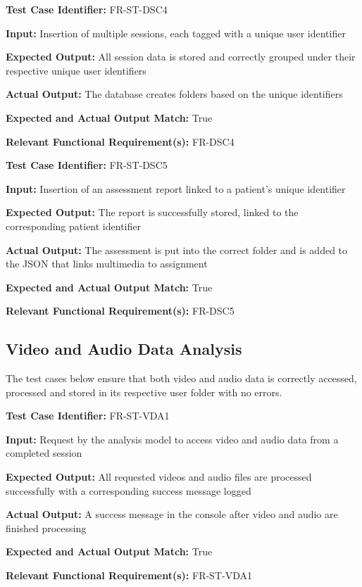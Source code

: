 \documentclass[12pt, titlepage]{article}
\begin{document}
\begin{mdframed}[linewidth=0.5mm] \par
  \textbf{Test Case Identifier:} FR-ST-DSC4 \par
  \textbf{Input:} Insertion of multiple sessions, each tagged with a unique user identifier \par
  \textbf{Expected Output:} All session data is stored and correctly grouped under their respective unique user identifiers \par
  \textbf{Actual Output:} The database creates folders based on the unique identifiers \par
  \textbf{Expected and Actual Output Match:} True \par
  \textbf{Relevant Functional Requirement(s):} FR-DSC4
\end{mdframed}

\begin{mdframed}[linewidth=0.5mm] \par
  \textbf{Test Case Identifier:} FR-ST-DSC5 \par
  \textbf{Input:} Insertion of an assessment report linked to a patient's unique identifier \par
  \textbf{Expected Output:} The report is successfully stored, linked to the corresponding patient identifier\par
  \textbf{Actual Output:} The assessment is put into the correct folder and is added to the JSON that links multimedia to assignment \par
  \textbf{Expected and Actual Output Match:} True \par
  \textbf{Relevant Functional Requirement(s):} FR-DSC5
\end{mdframed}

\newpage{}

\subsection{Video and Audio Data Analysis}
\hspace{2em}The test cases below ensure that both video and audio data is correctly accessed, processed and stored 
in its respective user folder with no errors.

\begin{mdframed}[linewidth=0.5mm] \par
  \textbf{Test Case Identifier:} FR-ST-VDA1 \par
  \textbf{Input:} Request by the analysis model to access video and audio data from a completed session \par
  \textbf{Expected Output:} All requested videos and audio files are processed successfully with a corresponding success message logged \par
  \textbf{Actual Output:} A success message in the console after video and audio are finished processing \par
  \textbf{Expected and Actual Output Match:} True \par
  \textbf{Relevant Functional Requirement(s):} FR-ST-VDA1
\end{mdframed}
\end{document}

